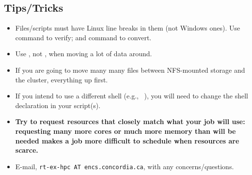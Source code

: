 ﻿%
\subsection{Tips/Tricks}
\label{sect:tips}

\begin{itemize}
\item
Files/scripts must have Linux line breaks in them (not Windows ones).
Use  command to verify; and  command
to convert.

\item
Use , not , when moving a lot of data around.

\item
If you are going to move many many files between NFS-mounted storage and the 
cluster,  everything up first. 

\item
If you intend to use a different shell (e.g., ~\cite{aosa-book-vol1-bash}),
you will need to change the shell declaration in your script(s).


\item
\textbf{Try to request resources that closely match what your job will use: 
requesting many more cores or much more memory than will be needed makes a 
job more difficult to schedule when resources are scarce.}

\item
E-mail, \texttt{rt-ex-hpc AT encs.concordia.ca}, with any concerns/questions.
\end{itemize}
